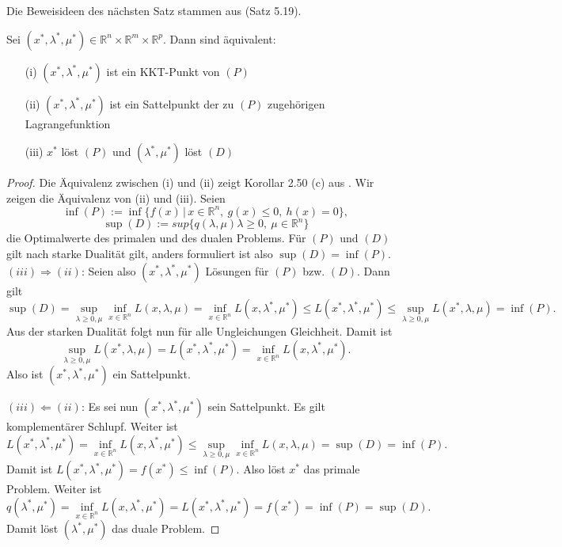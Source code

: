 Die Beweisideen des nächsten Satz stammen aus \cite{g-af-09} (Satz 5.19).
\begin{satz}
	\label{dual-satz}
	 Sei  $(x^*,\lambda^*,\mu^*) \in \mathbb{R}^n \times \mathbb{R}^m \times \mathbb{R}^p$. Dann sind äquivalent:
	\begin{itemize}
		\item[(i)] $(x^*, \lambda^*, \mu^*)$ ist ein KKT-Punkt von $(P)$
		\item[(ii)] $(x^*, \lambda^*, \mu^*)$ ist ein Sattelpunkt der zu $(P)$ zugehörigen Lagrangefunktion
		\item[(iii)] $x^*$ löst $(P)$ und $(\lambda^*, \mu^*)$ löst $(D)$
	\end{itemize}
\end{satz}
\begin{proof}
	Die Äquivalenz zwischen (i) und (ii) zeigt Korollar 2.50 (c) aus \cite{gk-tnro}. Wir zeigen die Äquivalenz von (ii) und (iii). 
	Seien 
	$$ \inf{(P)} := \inf{\{ f(x) \, | \, x \in \mathbb{R}^n ,\ g(x) \leq 0 ,\ h(x) = 0 \}},$$
	$$
	\sup{(D)} := sup{\{ q(\lambda, \mu) \lambda \geq 0 ,\ \mu \in \mathbb{R}^n \}}
	$$
	die Optimalwerte des primalen und des dualen Problems. Für $(P)$ und $(D)$ gilt nach \cite{gk-tnro} starke Dualität gilt, anders formuliert ist also $\sup{(D)} = \inf{(P)}$. \\
	
	$(iii) \Rightarrow (ii)$:
	Seien also $(x^*,\lambda^*,\mu^*)$ Lösungen für $(P)$ bzw. $(D)$. Dann gilt
	$$
	\sup(D) = \sup_{\lambda \geq 0, \mu} \inf_{x \in \mathbb{R}^n}{L(x,\lambda, \mu)} = \inf_{x \in \mathbb{R}^n} L(x, \lambda^*, \mu^*) \leq  L(x^*, \lambda^*,\mu^*) \leq \sup_{\lambda \geq 0, \mu} L(x^*, \lambda, \mu) = \inf{(P)}.
	$$
	Aus der starken Dualität folgt nun für alle Ungleichungen Gleichheit. Damit ist $$
	\sup_{\lambda \geq 0, \mu} L(x^*, \lambda, \mu) = L(x^*, \lambda^*,\mu^*) = \inf_{x \in \mathbb{R}^n} L(x, \lambda^*, \mu^*).$$
	Also ist $(x^*,\lambda^*, \mu^*)$ ein Sattelpunkt.
	
	$(iii) \Leftarrow (ii)$: Es sei nun $(x^*, \lambda^*, \mu^*)$ sein Sattelpunkt. Es gilt komplementärer Schlupf. Weiter ist 
	$$
	L(x^*,\lambda^*,\mu^*) = \inf_{x\in\mathbb{R}^n}L(x,\lambda^*,\mu^*) \leq  \sup_{\lambda \geq 0, \mu}\inf_{x\in\mathbb{R}^n}L(x,\lambda,\mu) = 
	\sup{(D)} = \inf{(P)}.
	$$
	Damit ist $L(x^*,\lambda^*,\mu^*) = f(x^*) \leq \inf{(P)}$. Also löst $x^*$ das primale Problem. Weiter ist 
	$$
	q(\lambda^*,\mu^*)=\inf_{x \in \mathbb{R}^n}{L(x,\lambda^*,\mu^*)} = L(x^*,\lambda^*,\mu^*) = f(x^*) = \inf{(P)} = \sup{(D)}.
	$$
	Damit löst $(\lambda^*, \mu^*)$ das duale Problem.	
\end{proof}

